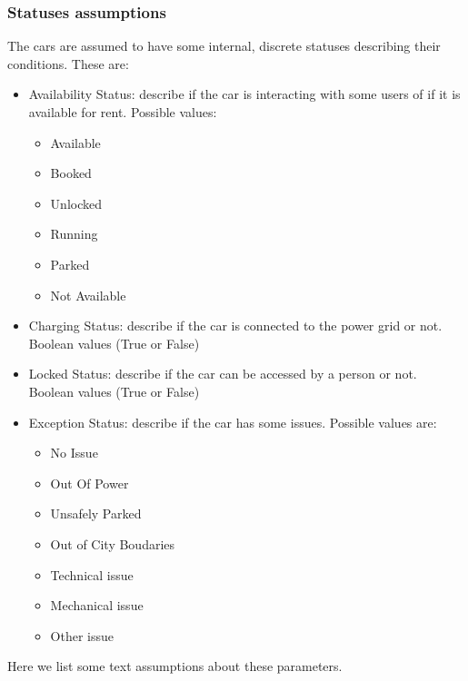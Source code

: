 \documentclass[11pt]{article} %
\begin{document}
\subsubsection{Statuses assumptions}
The cars are assumed to have some internal, discrete statuses describing their conditions. These are:
\begin{itemize}
	\item{Availability Status}: describe if the car is interacting with some users of if it is available for rent. Possible values:
		\begin{itemize}
		\item Available
		\item Booked
		\item Unlocked
		\item Running
		\item Parked
		\item Not Available
		\end{itemize}
	\item{Charging Status}: describe if the car is connected to the power grid or not. Boolean values (True or False)
	\item{Locked Status}: describe if the car can be accessed by a person or not. Boolean values (True or False)
	\item{Exception Status}: describe if the car has some issues. Possible values are:
		\begin{itemize}
		\item No Issue
		\item Out Of Power
		\item Unsafely Parked
		\item Out of City Boudaries
		\item Technical issue
		\item Mechanical issue
		\item Other issue
		\end{itemize}
\end{itemize}
Here we list some text assumptions about these parameters.
\end{document}
